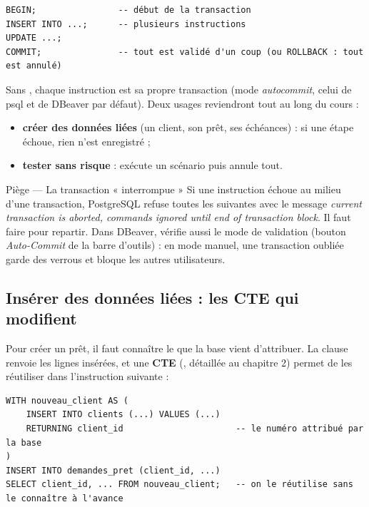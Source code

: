 \begin{lstlisting}[style=sql]
BEGIN;                -- début de la transaction
INSERT INTO ...;      -- plusieurs instructions
UPDATE ...;
COMMIT;               -- tout est validé d'un coup (ou ROLLBACK : tout est annulé)
\end{lstlisting}

Sans , chaque instruction est sa propre transaction (mode \emph{autocommit}, celui de psql
et de DBeaver par défaut). Deux usages reviendront tout au long du cours :
\begin{itemize}
\item \textbf{créer des données liées} (un client, son prêt, ses échéances) : si une étape échoue, rien
n'est enregistré ;
\item \textbf{tester sans risque} :  exécute un scénario puis annule tout.
\end{itemize}

\begin{piege}{Piège --- La transaction « interrompue »}
Si une instruction échoue au milieu d'une transaction, PostgreSQL refuse toutes les suivantes avec
le message \emph{current transaction is aborted, commands ignored until end of transaction block}. Il
faut faire  pour repartir. Dans DBeaver, vérifie aussi le mode de validation (bouton
\emph{Auto-Commit} de la barre d'outils) : en mode manuel, une transaction oubliée garde des verrous et
bloque les autres utilisateurs.
\end{piege}

\subsection{Insérer des données liées : les CTE qui modifient}

Pour créer un prêt, il faut connaître le  que la base vient d'attribuer. La clause
 renvoie les lignes insérées, et une \textbf{CTE} (, détaillée au chapitre 2)
permet de les réutiliser dans l'instruction suivante :

\begin{lstlisting}[style=sql]
WITH nouveau_client AS (
    INSERT INTO clients (...) VALUES (...)
    RETURNING client_id                      -- le numéro attribué par la base
)
INSERT INTO demandes_pret (client_id, ...)
SELECT client_id, ... FROM nouveau_client;   -- on le réutilise sans le connaître à l'avance
\end{lstlisting}

